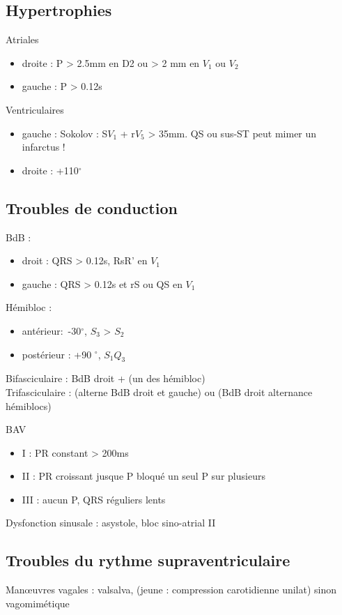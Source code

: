 \subsection{Hypertrophies}

Atriales
\begin{itemize}
  \item droite : P > 2.5mm en D2 ou > 2 mm en $V_1$ ou $V_2$
  \item gauche : P > 0.12s
\end{itemize}
Ventriculaires
\begin{itemize}
  \item gauche : Sokolov : S$V_1$ + r$V_5$ > 35mm. \danger{} QS ou sus-ST peut
    mimer un infarctus !
  \item droite : +110$^{\circ}$
\end{itemize}

\subsection{Troubles de conduction}
BdB :
\begin{itemize}
  \item droit : QRS > 0.12s, RsR' en $V_1$ 
  \item gauche : QRS > 0.12s et rS ou QS en $V_1$
\end{itemize}
Hémibloc : 
\begin{itemize}
  \item antérieur: -30$^{\circ}$, $S_3$ > $S_2$
  \item postérieur : +90 $^{\circ}$, $S_1 Q_3$
\end{itemize}
Bifasciculaire : BdB droit + (un des hémibloc)\\
Trifasciculaire \skull : (alterne BdB droit et gauche) ou (BdB droit \land{}
alternance hémiblocs)

BAV
\begin{itemize}
  \item I : PR constant > 200ms
  \item II : PR croissant jusque P bloqué \lor{} un seul P sur plusieurs
  \item III : aucun P, QRS réguliers lents
\end{itemize}

Dysfonction sinusale : asystole, bloc sino-atrial II

\subsection{Troubles du rythme supraventriculaire}
Man\oe{}uvres vagales : valsalva, (jeune : compression carotidienne unilat) sinon
vagomimétique

